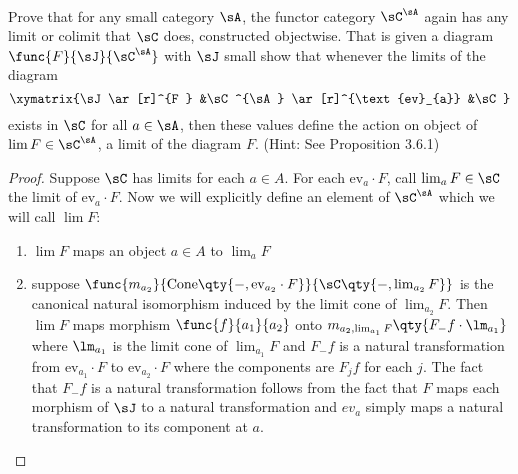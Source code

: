 \documentclass[../../main]{subfiles}
\begin{document}
\paragraph{}
\begin{exercise}
	Prove that for any small category $\sA$, the functor category $\sC^{\sA}$
	again has any limit or colimit that $\sC$ does, constructed objectwise. That
	is given a diagram $\func{F}{\sJ}{\sC^{\sA}}$ with $\sJ$ small show that
	whenever the limits of the diagram $$ \xymatrix{\sJ \ar[r]^{F } &\sC^{\sA}
	\ar[r]^{\text{ev}_{a}} &\sC} $$ exists in $\sC$ for all $a \in \sA$, then
	these values define the action on object of $\lim F \in \sC^{\sA}$, a limit
	of the diagram $F$. (Hint: See Proposition 3.6.1)
\end{exercise}

\begin{proof}
	Suppose $\sC$ has limits for each $a \in A$. For each $\text{ev}_{a} \cdot
	F$, call $\lim_{a} F \in \sC$ the limit of $\text{ev}_{a} \cdot F$. Now we
	will explicitly define an element of $\sC^{\sA}$ which we will call $\lim
	F$:
	\begin{enumerate}
		\item $\lim F$ maps an object $a \in A$ to $\lim_{a} F$

		\item suppose $\func{m_{a_2}}{\text{Cone}\qty{-,\text{ev}_{a_2} \cdot
			F}}{\sC\qty{-,\lim_{a_2} F}}$ is the canonical natural isomorphism
			induced by the limit cone of $\lim_{a_2} F$. Then $\lim F$ maps
			morphism $\func{f}{a_1}{a_2}$ onto $m_{a_2,\lim_{a_1} F}\qty{F_{-}f
			\cdot \lm_{a_1}}$ where $\lm_{a_1}$ is the limit cone of $\lim_{a_1}
			F$ and $F_{-}f$ is a natural transformation from $\text{ev}_{a_1}
			\cdot F $ to $\text{ev}_{a_2} \cdot F $ where the components are
			$F_{j}f$ for each $j$. The fact that $F_{-}f$ is a natural
			transformation follows from the fact that $F$ maps each morphism of
			$\sJ$ to a natural transformation and $ev_{a}$ simply maps a natural
			transformation to its component at $a$.
	\end{enumerate}


\end{proof}
\end{document}
